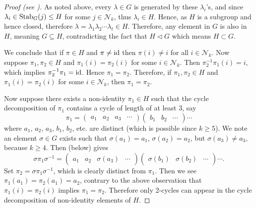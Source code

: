 \begin{proof}[Proof (see {\cite[pp.~149--150, Theorem 24]{dummit_foote_2004}})]
    As noted above, every $\lambda \in G$ is generated by these $\lambda_i$'s, and since $\lambda_i \in \mathrm{Stab}_{G}(j) \leq H$ for some $j \in \mathcal{N}_{k}$, thus $\lambda_i \in H$. Hence, as $H$ is a subgroup and hence closed, therefore $\lambda = \lambda_1\lambda_2\cdots\lambda_t \in H$. Therefore, any element in $G$ is also in $H$, meaning $G \subseteq H$, contradicting the fact that $H \lhd G$ which means $H \subset G$.
    
    We conclude that if $\pi \in H$ and $\pi \neq \mathrm{id}$ then $\pi(i) \neq i$ for all $i \in \mathcal{N}_k$. Now suppose $\pi_1, \pi_2 \in H$ and $\pi_1(i) = \pi_2(i)$ for some $i \in \mathcal{N}_{k}$. Then $\pi_2^{-1}\pi_1(i) = i$, which implies $\pi_2^{-1}\pi_1 = \mathrm{id}$. Hence $\pi_1 = \pi_2$. Therefore, if $\pi_1, \pi_2 \in H$ and $\pi_1(i) = \pi_2(i)$ for some $i \in \mathcal{N}_{k}$, then $\pi_1 = \pi_2$.

    Now suppose there exists a non-identity $\pi_1 \in H$ such that the cycle decomposition of $\pi_1$ contains a cycle of length of at least 3, say
    \[
        \pi_1 = \begin{pmatrix}a_1&a_2&a_3&\cdots\end{pmatrix} \begin{pmatrix}b_1&b_2&\cdots\end{pmatrix}\cdots
    \]
    where $a_1$, $a_2$, $a_3$, $b_1$, $b_2$, etc. are distinct (which is possible since $k \geq 5$). We note an element $\sigma \in G$ exists such that $\sigma(a_1) = a_1$, $\sigma(a_2) = a_2$, but $\sigma(a_3) \neq a_3$, because $k \geq 4$. Then  (below) gives
    \[
        \sigma\pi_1\sigma^{-1} = \begin{pmatrix}a_1&a_2&\sigma(a_3)&\cdots\end{pmatrix} \begin{pmatrix}\sigma(b_1)&\sigma(b_2)&\cdots\end{pmatrix}\cdots.
    \]
    Set $\pi_2 = \sigma\pi_1\sigma^{-1}$, which is clearly distinct from $\pi_1$. Then we see $\pi_1(a_1) = \pi_2(a_1) = a_2$, contrary to the above observation that $\pi_1(i) = \pi_2(i)$ implies $\pi_1 = \pi_2$. Therefore only 2-cycles can appear in the cycle decomposition of non-identity elements of $H$.


\end{proof}
